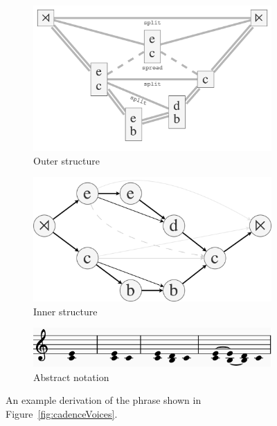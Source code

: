 \documentclass[12pt,a4paper,twoside,openright]{report}
\theoremstyle{definition}
\begin{document}
\begin{figure}[h]
  \centering
  \begin{subfigure}[t]{.55\textwidth}
    \centering\includegraphics[keepaspectratio,width=\textwidth]{prep/cadenceouterder.png}
    \caption{Outer structure}
    \label{fig:cadenceOuterDer}
  \end{subfigure}
  \begin{subfigure}[t]{.42\textwidth}
    \centering\includegraphics[keepaspectratio,width=\textwidth]{prep/cadenceinnerder.png}
    \caption{Inner structure}
    \label{fig:cadenceInnerDer}
  \end{subfigure}
  \begin{subfigure}[t]{.8\textwidth}
    \centering\includegraphics[keepaspectratio,width=\textwidth]{prep/cadencederivation.png}
    \caption{Abstract notation}
    \label{fig:cadenceDerivation}
  \end{subfigure}

  \captionsetup{width=.9\linewidth}
  \caption{An example derivation of the phrase shown in Figure~\ref{fig:cadenceVoices}. }
  \label{fig:innerOuterStructure}
\end{figure}
\end{document}
